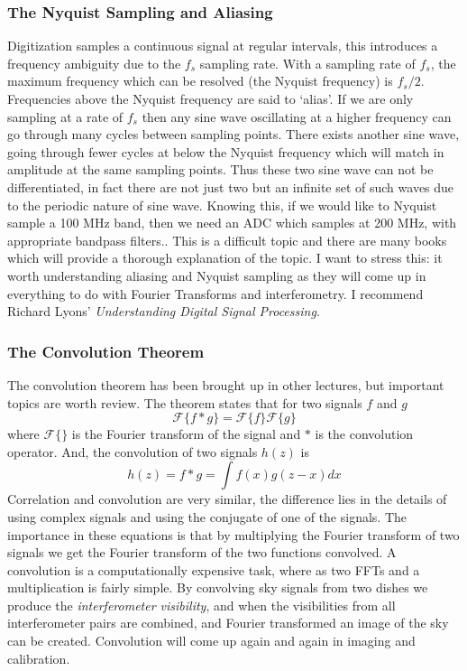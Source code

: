 \documentclass[usenatbib,usegraphicx]{article}
\begin{document}
\subsubsection{The Nyquist Sampling and Aliasing}

Digitization samples a continuous signal at regular intervals, this introduces a frequency ambiguity due to the $f_s$ sampling rate.
With a sampling rate of $f_s$, the maximum frequency which can be resolved (the Nyquist frequency) is $f_s/2$.
Frequencies above the Nyquist frequency are said to `alias'.
If we are only sampling at a rate of $f_s$ then any sine wave oscillating at a higher frequency can go through many cycles between sampling points.
There exists another sine wave, going through fewer cycles at below the Nyquist frequency which will match in amplitude at the same sampling points.
Thus these two sine wave can not be differentiated, in fact there are not just two but an infinite set of such waves due to the periodic nature of sine wave.
Knowing this, if we would like to Nyquist sample a 100 MHz band, then we need an ADC which samples at 200 MHz, with appropriate bandpass filters..
This is a difficult topic and there are many books which will provide a thorough explanation of the topic.
I want to stress this: it worth understanding aliasing and Nyquist sampling as they will come up in everything to do with Fourier Transforms and interferometry.
I recommend Richard Lyons' \emph{Understanding Digital Signal Processing}.

\subsubsection{The Convolution Theorem}

The convolution theorem has been brought up in other lectures, but important topics are worth review.
The theorem states that for two signals $f$ and $g$
%
\begin{equation}
\label{eq:convolution_theorem}
\mathcal{F}\{ f \ast g \} = \mathcal{F}\{f\} \mathcal{F}\{g\}
\end{equation}
%
where $\mathcal{F}\{\}$ is the Fourier transform of the signal and $\ast$ is the convolution operator.
And, the convolution of two signals $h(z)$ is
%
\begin{equation}
\label{eq:convolution}
h(z) = f \ast g = \int f(x)g(z-x)dx
\end{equation}
%
Correlation and convolution are very similar, the difference lies in the details of using complex signals and using the conjugate of one of the signals.
The importance in these equations is that by multiplying the Fourier transform of two signals we get the Fourier transform of the two functions convolved.
A convolution is a computationally expensive task, where as two FFTs and a multiplication is fairly simple.
By convolving sky signals from two dishes we produce the \emph{interferometer visibility}, and when the visibilities from all interferometer pairs are combined, and Fourier transformed an image of the sky can be created.
Convolution will come up again and again in imaging and calibration.
\end{document}
